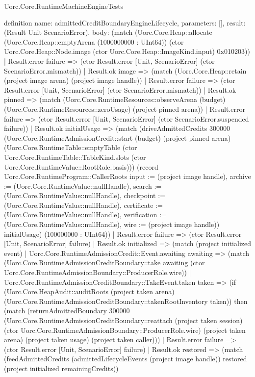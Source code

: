 \begin{lexlean}{Uorc.Core.RuntimeMachineEngineTests}
\begin{semanticmodule}
definition{
  name: admittedCreditBoundaryEngineLifecycle,
  parameters: [],
  result: (Result Unit ScenarioError),
  body: (match (Uorc.Core.Heap::allocate (Uorc.Core.Heap::emptyArena (1000000000 : UInt64)) (ctor Uorc.Core.Heap::Node.image (ctor Uorc.Core.Heap::ImageKind.input) 0x010203))
    | Result.error failure => (ctor Result.error [Unit, ScenarioError] (ctor ScenarioError.mismatch))
    | Result.ok image => (match (Uorc.Core.Heap::retain (project image arena) (project image handle))
      | Result.error failure => (ctor Result.error [Unit, ScenarioError] (ctor ScenarioError.mismatch))
      | Result.ok pinned => (match (Uorc.Core.RuntimeResources::observeArena (budget) (Uorc.Core.RuntimeResources::zeroUsage) (project pinned arena))
        | Result.error failure => (ctor Result.error [Unit, ScenarioError] (ctor ScenarioError.suspended failure))
        | Result.ok initialUsage => (match (driveAdmittedCredits 300000 (Uorc.Core.RuntimeAdmissionCredit::start (budget) (project pinned arena) (Uorc.Core.RuntimeTable::emptyTable (ctor Uorc.Core.RuntimeTable::TableKind.slots (ctor Uorc.Core.RuntimeValue::RootRole.basis))) (record Uorc.Core.RuntimeProgram::CallerRoots {input := (project image handle), archive := (Uorc.Core.RuntimeValue::nullHandle), search := (Uorc.Core.RuntimeValue::nullHandle), checkpoint := (Uorc.Core.RuntimeValue::nullHandle), certificate := (Uorc.Core.RuntimeValue::nullHandle), verification := (Uorc.Core.RuntimeValue::nullHandle), wire := (project image handle)}) initialUsage) (100000000 : UInt64))
          | Result.error failure => (ctor Result.error [Unit, ScenarioError] failure)
          | Result.ok initialized => (match (project initialized event)
            | Uorc.Core.RuntimeAdmissionCredit::Event.awaiting awaiting => (match (Uorc.Core.RuntimeAdmissionCreditBoundary::take awaiting (ctor Uorc.Core.RuntimeAdmissionBoundary::ProducerRole.wire))
              | Uorc.Core.RuntimeAdmissionCreditBoundary::TakeEvent.taken taken => (if (Uorc.Core.HeapAudit::auditRoots (project taken arena) (Uorc.Core.RuntimeAdmissionCreditBoundary::takenRootInventory taken)) then (match (returnAdmittedBoundary 300000 (Uorc.Core.RuntimeAdmissionCreditBoundary::reattach (project taken session) (ctor Uorc.Core.RuntimeAdmissionBoundary::ProducerRole.wire) (project taken arena) (project taken usage) (project taken caller)))
                | Result.error failure => (ctor Result.error [Unit, ScenarioError] failure)
                | Result.ok restored => (match (feedAdmittedCredits (admittedLifecycleEvents (project image handle)) restored (project initialized remainingCredits))
}
\end{semanticmodule}
\end{lexlean}
